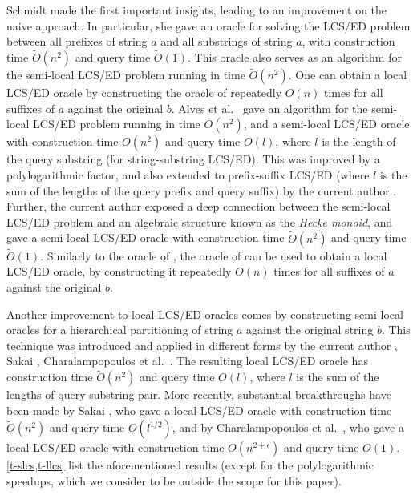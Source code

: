\documentclass[a4paper,UKenglish,cleveref]{lipics-v2021}
\begin{document}
Schmidt \cite{Schmidt:98} made the first important insights,
leading to an improvement on the naive approach.
In particular, she gave an oracle for solving the LCS/ED problem 
between all prefixes of string $a$ and all substrings of string $a$,
with construction time $\tilde O(n^2)$ and query time $\tilde O(1)$.
This oracle also serves as an algorithm for the semi-local LCS/ED problem running in time $\tilde O(n^2)$.
One can obtain a local LCS/ED oracle by constructing the oracle of \cite{Schmidt:98} 
repeatedly $O(n)$ times for all suffixes of $a$ against the original $b$.
Alves et al.\ \cite{Alves+:08} gave an algorithm for the semi-local LCS/ED problem running in time $O(n^2)$,
and a semi-local LCS/ED oracle with construction time $O(n^2)$ and query time $O(l)$,
where $l$ is the length of the query substring (for string-substring LCS/ED).
This was improved by a polylogarithmic factor, and also extended to prefix-suffix LCS/ED
(where $l$ is the sum of the lengths of the query prefix and query suffix)
by the current author \cite{Tiskin:06_CSR}.
Further, the current author \cite{Tiskin:06_CSR,Tiskin:08} exposed a deep connection 
between the semi-local LCS/ED problem and an algebraic structure known as the \emph{Hecke monoid},
and gave a semi-local LCS/ED oracle
with construction time $\tilde O(n^2)$ and query time $\tilde O(1)$.
Similarly to the oracle of \cite{Schmidt:98}, the oracle of \cite{Tiskin:06_CSR,Tiskin:08}
can be used to obtain a local LCS/ED oracle, by constructing it
repeatedly $O(n)$ times for all suffixes of $a$ against the original $b$.

Another improvement to local LCS/ED oracles comes by constructing semi-local oracles
for a hierarchical partitioning of string $a$ against the original string $b$.
This technique was introduced and applied in different forms 
by the current author \cite{Tiskin:08}, Sakai \cite{Sakai:19}, 
Charalampopoulos et al.\ \cite{Charalampopoulos+:20}.
The resulting local LCS/ED oracle
has construction time $\tilde O(n^2)$ and query time $O(l)$,
where $l$ is the sum of the lengths of query substring pair.
More recently, substantial breakthroughs have been made by Sakai \cite{Sakai:22},
who gave a local LCS/ED oracle
with construction time $\tilde O(n^2)$ and query time $O(l^{1/2})$,
and by Charalampopoulos et al.\ \cite{Charalampopoulos+:20},
who gave a local LCS/ED oracle
with construction time $O(n^{2+\epsilon})$ and query time $O(1)$.
\cref{t-slcs,t-llcs} list the aforementioned results
(except for the polylogarithmic speedups, which we consider to be outside the scope for this paper).
\end{document}
